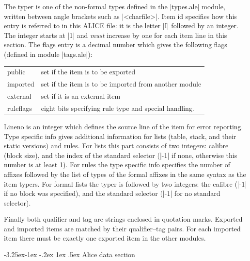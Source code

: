 \documentclass[titlepage]{article}
\makeatletter
\newcommand\I{\textsf{ALICE}}
\newcommand\g[1]{\textsf{\color{blue!90!black}#1}}
\renewcommand\subsection{%
\@startsection{subsection}{2}{\z@}%
   {-3.25ex\@plus -1ex \@minus -.2ex}%
   {1ex \@plus .5ex}%
   {\normalfont\normalsize\bfseries}}
\makeatother
\begin{document}
\noindent
The \g{typer} is one of the non-formal types defined in the \pp|types.ale|
module, written between angle brackets such as \pp|<charfile>|. \g{Item id}
specifies how this entry is referred to in this \I{} file: it is 
the letter \pp|I| followed by an integer. The integer starts at \pp|1| and
\emph{must} increase by one for each item line in this section.
%
The \g{flags} entry is a decimal number which gives the following flags
(defined in module \pp|tags.ale|):
\begin{center}\begin{tabular}{ll}
\g{public} & set if the item is to be exported \\
\g{imported}& set if the item is to be imported from another module \\
\g{external}& set if it is an external item \\
\g{ruleflags}& eight bits specifying rule type and special handling.
\end{tabular}\end{center}

\g{Lineno} is an integer which defines the source line of the item for error
reporting. \g{Type specific info} gives additional information for lists
(\g{table}, \g{stack}, and their static versions) and \g{rule}s. For lists this
part consists of two integers: calibre (block size), and the index of the
standard selector (\pp|-1| if none, otherwise this number is at least 1).
For rules the \g{type specific info} specifies the number of affixes
followed by the list of types of the formal affixes in the same syntax as
the item \g{typer}s. For formal lists the typer is followed by two integers:
the calibre (\pp|-1| if no block was specified), and the standard selector
(\pp|-1| for no standard selector).

Finally both \g{qualifier} and \g{tag} are strings enclosed in quotation
marks. Exported and imported items are matched by their qualifier--tag
pairs. For each imported item there must be exactly one exported item in the
other modules.

\subsection{Alice data section}\label{alice:data}
\end{document}
